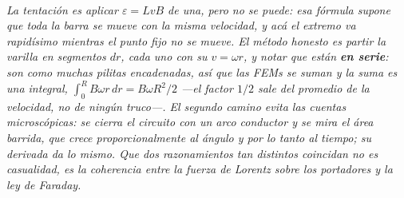 \begin{center}
\\[0.5em]
{\small\itshape La tentación es aplicar $\varepsilon = LvB$ de una, pero no se
puede: esa fórmula supone que toda la barra se mueve con la misma velocidad, y
acá el extremo va rapidísimo mientras el punto fijo no se mueve. El método
honesto es partir la varilla en segmentos $dr$, cada uno con su
$v=\omega r$, y notar que están \textbf{en serie}: son como muchas pilitas
encadenadas, así que las FEMs se suman y la suma es una integral,
$\int_0^R B\omega r\,dr = B\omega R^2/2$ ---el factor $1/2$ sale del promedio de
la velocidad, no de ningún truco---. El segundo camino evita las cuentas
microscópicas: se cierra el circuito con un arco conductor y se mira el
\emph{área barrida}, que crece proporcionalmente al ángulo y por lo tanto al
tiempo; su derivada da lo mismo. Que dos razonamientos tan distintos coincidan
no es casualidad, es la coherencia entre la fuerza de Lorentz sobre los
portadores y la ley de Faraday.}
\end{center}
